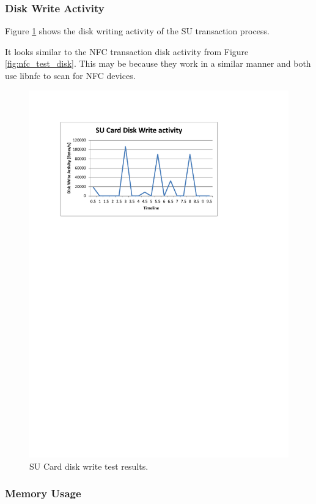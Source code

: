 \subsubsection{Disk Write Activity}

Figure \ref{fig:su_test_disk} shows the disk writing activity of the SU transaction
process. 

It looks similar to the NFC transaction disk activity from Figure \ref{fig:nfc_test_disk}.
This may be because they work in a similar manner and both use libnfc to scan for NFC
devices.

\begin{figure}
 \centering 
 \includegraphics[clip=true, trim = 0 550 80 70,
 scale=0.7]{su_test_disk}
 \caption{SU Card disk write test results.}
 \label{fig:su_test_disk}
\end{figure}

\subsubsection{Memory Usage}

